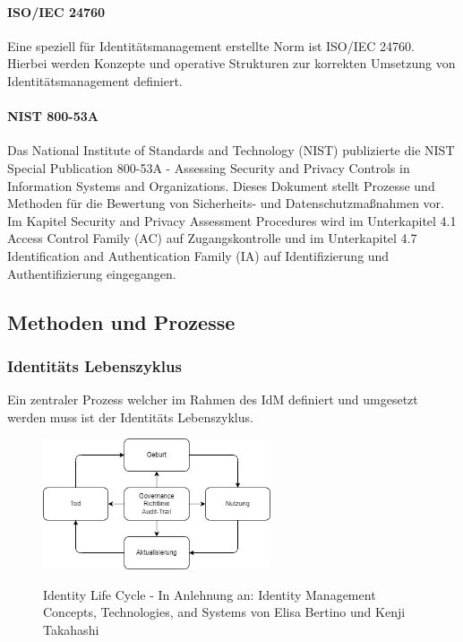 \documentclass[10pt]{article}
\begin{document}
\paragraph{ISO/IEC 24760}
Eine speziell für Identitätsmanagement erstellte Norm ist ISO/IEC 24760. Hierbei werden Konzepte und operative Strukturen zur korrekten Umsetzung von Identitätsmanagement definiert.~\cite{isoiec24760}
\paragraph{NIST 800-53A}
Das National Institute of Standards and Technology (NIST) publizierte die \glqq{}NIST Special Publication 800-53A - Assessing Security and Privacy Controls in Information Systems and Organizations\grqq{}. Dieses Dokument stellt Prozesse und Methoden für die Bewertung von Sicherheits- und Datenschutzmaßnahmen vor. Im Kapitel \glqq{}Security and Privacy Assessment Procedures\grqq{} wird im Unterkapitel 4.1 \glqq{}Access Control Family (AC)\grqq{} auf Zugangskontrolle und im Unterkapitel 4.7 \glqq{}Identification and Authentication Family (IA)\grqq{} auf Identifizierung und Authentifizierung eingegangen.
\subsection{Methoden und Prozesse}
\subsubsection{Identitäts Lebenszyklus}
Ein zentraler Prozess welcher im Rahmen des IdM definiert und umgesetzt werden muss ist der Identitäts Lebenszyklus.
\begin{figure}
  \centering
  \includegraphics[width=0.6\textwidth]{assets/idlc.png}
  \label{fig:idlc}
  \caption{Identity Life Cycle - In Anlehnung an: Identity Management Concepts, Technologies, and Systems von Elisa Bertino und Kenji Takahashi}
\end{figure}
\end{document}
